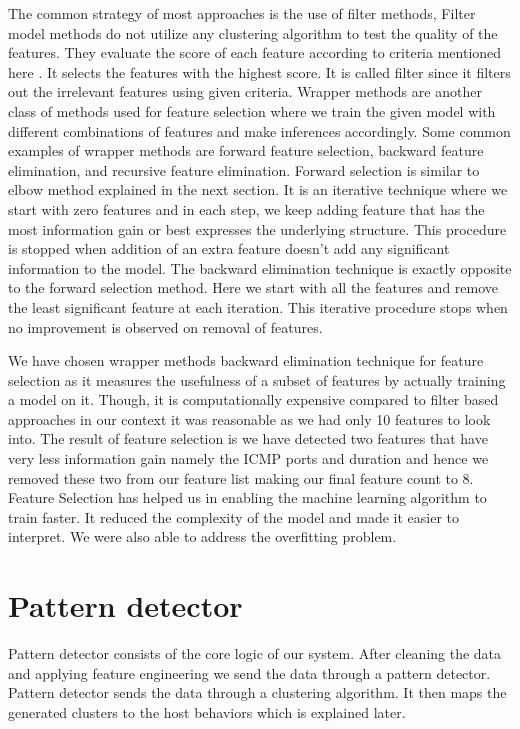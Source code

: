 	The common strategy of most approaches is the use of filter methods, Filter model methods do not utilize any clustering algorithm to test the quality of the features. They evaluate the score of each feature according to criteria mentioned here \cite{dash2002feature}. It selects the features with the highest score. It is called filter since it filters out the irrelevant features using given criteria. 
	Wrapper methods are another class of methods used for feature selection where we train the given model with different combinations of features and make inferences accordingly.
	Some common examples of wrapper methods are forward feature selection, backward feature elimination, and recursive feature elimination. Forward selection is similar to elbow method explained in the next section. It is an iterative technique where we start with zero features and in each step, we keep adding feature that has the most information gain or best expresses the underlying structure. This procedure is stopped when addition of an extra feature doesn't add any significant information to the model. The backward elimination technique is exactly opposite to the forward selection method. Here we start with all the features and remove the least significant feature at each iteration. This iterative procedure stops when no improvement is observed on removal of features.
	
	We have chosen wrapper methods backward elimination technique for feature selection as it measures the usefulness of a subset of features by actually training a model on it. Though, it is computationally expensive compared to filter based approaches in our context it was reasonable as we had only 10 features to look into. The result of feature selection is we have detected two features that have very less information gain namely the ICMP ports and duration and hence we removed these two from our feature list making our final feature count to 8.
	 Feature Selection has helped us in enabling the machine learning algorithm to train faster. It reduced the complexity of the model and made it easier to interpret. We were also able to address the overfitting problem.






\section{Pattern detector}
Pattern detector consists of the core logic of our system. After cleaning the data and applying feature engineering we send the data through a pattern detector. Pattern detector sends the data through a clustering algorithm. It then maps the generated clusters to the host behaviors which is explained later.

